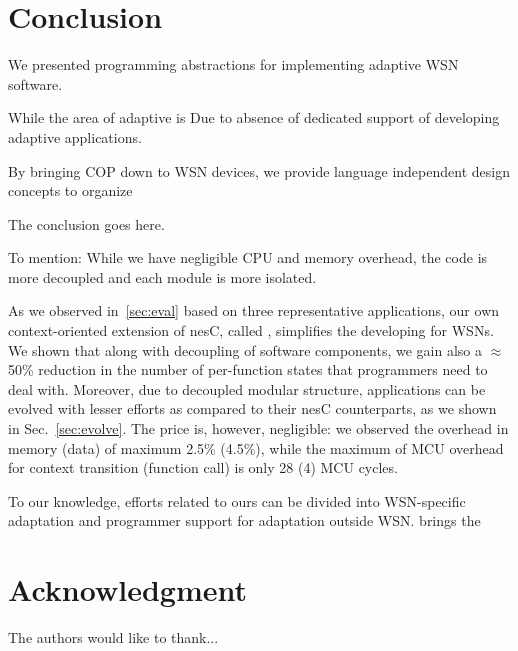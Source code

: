 \section{Conclusion}\label{sec:ending}

We presented programming abstractions for implementing adaptive WSN software. 

While the area of adaptive is Due to absence of dedicated support of developing adaptive applications.

By bringing COP down to WSN devices, we provide language independent design concepts to organize

The conclusion goes here.

To mention: While we have negligible CPU and memory overhead, the code is more decoupled and each module is more isolated.

As we observed in~\ref{sec:eval} based on three representative applications, our own context-oriented extension of nesC, called \conesc, simplifies the developing for WSNs. We shown that along with decoupling of software components, we gain also a $\approx$50\% reduction in the number of per-function states that programmers need to deal with. Moreover, due to decoupled modular structure, \conesc applications can be evolved with lesser efforts as compared to their nesC counterparts, as we shown in Sec.~\ref{sec:evolve}. The price is, however, negligible: we observed the overhead in memory (data) of maximum 2.5\% (4.5\%), while the maximum of MCU overhead for context transition (function call) is only 28 (4) MCU cycles.

To our knowledge, efforts related to ours can be divided into WSN-specific adaptation and programmer support for adaptation outside WSN. \conesc brings the 




\section*{Acknowledgment}


The authors would like to thank...







%
%
%
